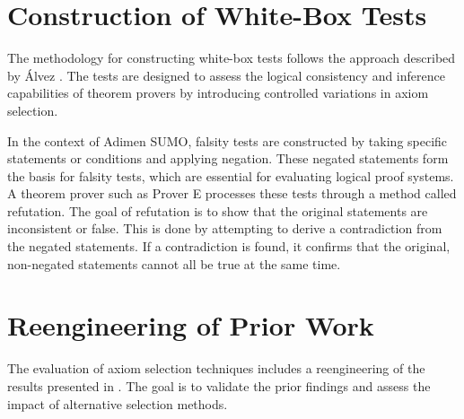 \documentclass[english,version-2020-11]{uzl-thesis}
\begin{document}
\section{Construction of White-Box Tests}

The methodology for constructing white-box tests follows the approach described by Álvez \cite{Álvez2017}. The tests are designed to assess the logical consistency and inference capabilities of theorem provers by introducing controlled variations in axiom selection.

In the context of Adimen SUMO, falsity tests are constructed by taking specific statements or conditions and applying negation. These negated statements form the basis for falsity tests, which are essential for evaluating logical proof systems. A theorem prover such as Prover E processes these tests through a method called refutation. The goal of refutation is to show that the original statements are inconsistent or false. This is done by attempting to derive a contradiction from the negated statements. If a contradiction is found, it confirms that the original, non-negated statements cannot all be true at the same time.

\section{Reengineering of Prior Work \cite{Schon2024}}

The evaluation of axiom selection techniques includes a reengineering of the results presented in \cite{Schon2024}. The goal is to validate the prior findings and assess the impact of alternative selection methods.
\end{document}
